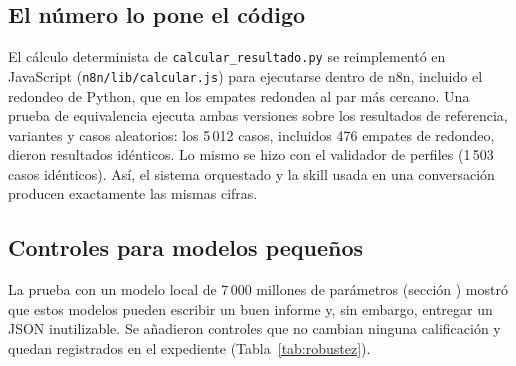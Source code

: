 \documentclass[12pt,letterpaper]{article}
\begin{document}
\subsection{El número lo pone el código}

El cálculo determinista de \texttt{calcular\_resultado.py} se reimplementó en JavaScript (\texttt{n8n/lib/calcular.js}) para ejecutarse dentro de n8n, incluido el redondeo de Python, que en los empates redondea al par más cercano. Una prueba de equivalencia ejecuta ambas versiones sobre los resultados de referencia, variantes y casos aleatorios: los 5\,012 casos, incluidos 476 empates de redondeo, dieron resultados idénticos. Lo mismo se hizo con el validador de perfiles (1\,503 casos idénticos). Así, el sistema orquestado y la skill usada en una conversación producen exactamente las mismas cifras.

\subsection{Controles para modelos pequeños}
\label{sec:robustez}

La prueba con un modelo local de 7\,000 millones de parámetros (sección ) mostró que estos modelos pueden escribir un buen informe y, sin embargo, entregar un JSON inutilizable. Se añadieron controles que no cambian ninguna calificación y quedan registrados en el expediente (Tabla~\ref{tab:robustez}).
\end{document}
